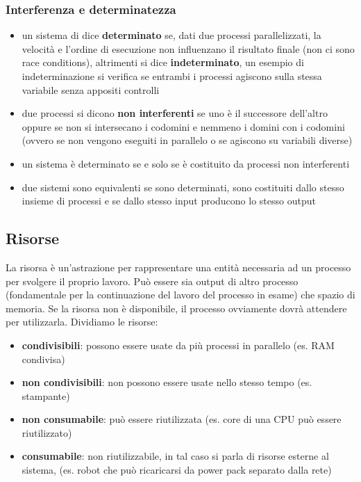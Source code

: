 \documentclass[a4paper]{article}
\begin{document}
\subsubsection*{Interferenza e determinatezza}
\begin{itemize}
	\item un sistema di dice \textbf{determinato} se, dati due processi parallelizzati, la velocità e l'ordine di esecuzione non
	influenzano il risultato finale (non ci sono race conditions), altrimenti si dice \textbf{indeterminato}, un esempio di 
	indeterminazione si verifica se entrambi i processi agiscono sulla stessa variabile senza appositi controlli
	\item due processi si dicono \textbf{non interferenti} se uno è il successore dell'altro oppure se non si intersecano i
	codomini e nemmeno i domini con i codomini (ovvero se non vengono eseguiti in parallelo o se agiscono su variabili diverse)
	\item un sistema è determinato se e solo se è costituito da processi non interferenti
	\item due sistemi sono equivalenti se sono determinati, sono costituiti dallo stesso insieme di processi e se dallo stesso
	input producono lo stesso output
\end{itemize}

\newpage


\subsection{Risorse}
La risorsa è un’astrazione per rappresentare una entità necessaria ad un processo per svolgere il proprio lavoro. Può essere sia
output di altro processo (fondamentale per la continuazione del lavoro del processo in esame) che spazio di memoria. Se la risorsa
non è disponibile, il processo ovviamente dovrà attendere per utilizzarla. Dividiamo le risorse:
\begin{itemize}
	\item \textbf{condivisibili}: possono essere usate da più processi in parallelo (es. RAM condivisa)
	\item \textbf{non condivisibili}: non possono essere usate nello stesso tempo (es. stampante)
	\item \textbf{non consumabile}: può essere riutilizzata (es. core di una CPU può essere riutilizzato)
	\item \textbf{consumabile}: non riutilizzabile, in tal caso si parla di risorse esterne al sistema, (es. robot che può ricaricarsi
	da power pack separato dalla rete)
\end{itemize}
\end{document}
